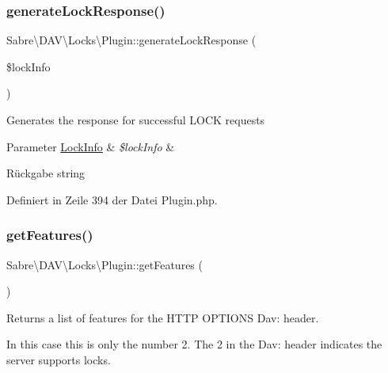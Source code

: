\subsubsection{\texorpdfstring{generate\+Lock\+Response()}{generateLockResponse()}}
{\footnotesize\ttfamily Sabre\textbackslash{}\+D\+A\+V\textbackslash{}\+Locks\textbackslash{}\+Plugin\+::generate\+Lock\+Response (\begin{DoxyParamCaption}\item[{\mbox{\hyperlink{class_sabre_1_1_d_a_v_1_1_locks_1_1_lock_info}{Lock\+Info}}}]{\$lock\+Info }\end{DoxyParamCaption})\hspace{0.3cm}{\ttfamily [protected]}}

Generates the response for successful L\+O\+CK requests


\begin{DoxyParams}[1]{Parameter}
\mbox{\hyperlink{class_sabre_1_1_d_a_v_1_1_locks_1_1_lock_info}{Lock\+Info}} & {\em \$lock\+Info} & \\
\hline
\end{DoxyParams}
\begin{DoxyReturn}{Rückgabe}
string 
\end{DoxyReturn}


Definiert in Zeile 394 der Datei Plugin.\+php.

\mbox{\label{class_sabre_1_1_d_a_v_1_1_locks_1_1_plugin_a1a1ab5c99088be46817dccc60a4875b6}} 
\subsubsection{\texorpdfstring{get\+Features()}{getFeatures()}}
{\footnotesize\ttfamily Sabre\textbackslash{}\+D\+A\+V\textbackslash{}\+Locks\textbackslash{}\+Plugin\+::get\+Features (\begin{DoxyParamCaption}{ }\end{DoxyParamCaption})}

Returns a list of features for the H\+T\+TP O\+P\+T\+I\+O\+NS Dav\+: header.

In this case this is only the number 2. The 2 in the Dav\+: header indicates the server supports locks.

